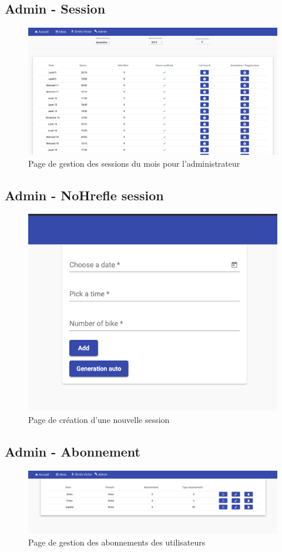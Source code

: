 	\vspace{\baselineskip}	
	\subsection{Admin - Session}
		\begin{figure}[h!]
       	 	\includegraphics[width=0.8\linewidth, center]{Mockup/Admin-Session.png}
       	 	\caption{Page de gestion des sessions du mois pour l'administrateur}
       	\end{figure}
       	
	\newpage
	\subsection{Admin - NoHrefle session}
		\begin{figure}[h!]
       	 	\includegraphics[width=0.8\linewidth, center]{Mockup/Admin-Nouvelle-Session.png}
       	 	\caption{Page de création d'une nouvelle session}
       	\end{figure}
       	
	\vspace{\baselineskip}
	\subsection{Admin - Abonnement}
		\begin{figure}[h!]
       	 	\includegraphics[width=0.8\linewidth, center]{Mockup/Admin-Abonnement.png}
       	 	\caption{Page de gestion des abonnements des utilisateurs}
       	\end{figure}
       	
